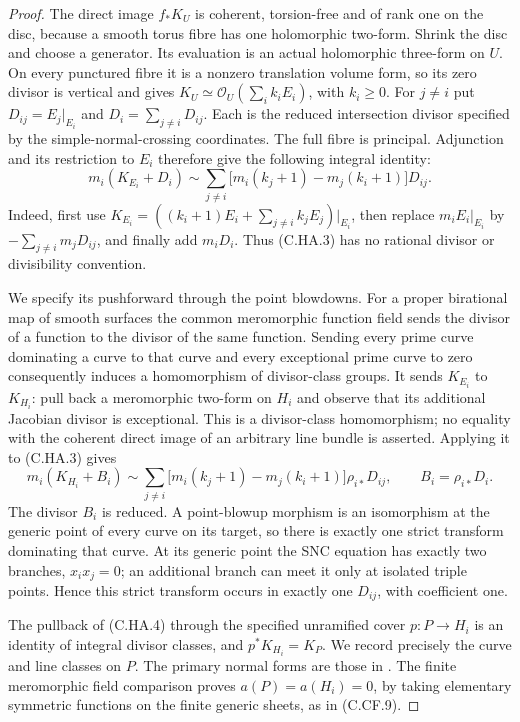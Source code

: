 \begin{proof}
The direct image $f_*K_U$ is coherent, torsion-free and of
rank one on the disc, because a smooth torus fibre has one
holomorphic two-form. Shrink the disc and choose a generator.
Its evaluation is an actual holomorphic three-form on $U$.
On every punctured fibre it is a nonzero translation volume
form, so its zero divisor is vertical and gives
$K_U\simeq\mathcal O_U(\sum_i k_iE_i)$, with $k_i\geq0$.
For $j\ne i$ put $D_{ij}=E_j|_{E_i}$ and
$D_i=\sum_{j\ne i}D_{ij}$. Each is the reduced intersection
divisor specified by the simple-normal-crossing coordinates.
The full fibre is principal. Adjunction and its restriction
to $E_i$ therefore give the following integral identity:
\[
 m_i(K_{E_i}+D_i)
 \sim\sum_{j\ne i}
       \bigl[m_i(k_j+1)-m_j(k_i+1)\bigr]D_{ij}.
\tag{C.HA.3}
\]
Indeed, first use
$K_{E_i}=((k_i+1)E_i+\sum_{j\ne i}k_jE_j)|_{E_i}$,
then replace $m_i E_i|_{E_i}$ by
$-\sum_{j\ne i}m_jD_{ij}$, and finally add $m_iD_i$.
Thus (C.HA.3) has no rational divisor or divisibility convention.

We specify its pushforward through the point blowdowns.
For a proper birational map of smooth surfaces the common
meromorphic function field sends the divisor of a function
to the divisor of the same function. Sending every prime
curve dominating a curve to that curve and every exceptional
prime curve to zero consequently induces a homomorphism
of divisor-class groups. It sends $K_{E_i}$ to $K_{H_i}$:
pull back a meromorphic two-form on $H_i$ and observe that
its additional Jacobian divisor is exceptional. This is a
divisor-class homomorphism; no equality with the coherent
direct image of an arbitrary line bundle is asserted.
Applying it to (C.HA.3) gives
\[
 m_i(K_{H_i}+B_i)
 \sim\sum_{j\ne i}
       \bigl[m_i(k_j+1)-m_j(k_i+1)\bigr]\rho_{i*}D_{ij},
 \qquad B_i=\rho_{i*}D_i.
\tag{C.HA.4}
\]
The divisor $B_i$ is reduced. A point-blowup morphism is an
isomorphism at the generic point of every curve on its target,
so there is exactly one strict transform dominating that curve.
At its generic point the SNC equation has exactly two branches,
$x_i x_j=0$; an additional branch can meet it only at isolated
triple points. Hence this strict transform occurs in exactly
one $D_{ij}$, with coefficient one.

The pullback of (C.HA.4) through the specified unramified
cover $p:P\to H_i$ is an identity of integral divisor classes,
and $p^*K_{H_i}=K_P$. We record precisely the curve and line
classes on $P$. The primary normal forms are those in
\cite[Theorem~2.1]{Khaled2024Hopf}. The finite meromorphic
field comparison proves $a(P)=a(H_i)=0$, by taking elementary
symmetric functions on the finite generic sheets, as in
(C.CF.9).


\end{proof}
